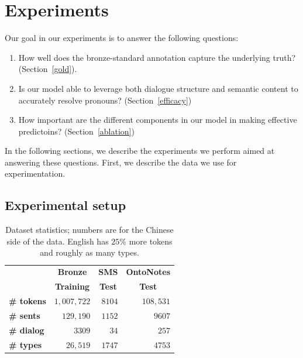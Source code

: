 \documentclass[11pt]{report}
\begin{document}
\section{Experiments} \label{focus_tracking_experiments}

Our goal in our experiments is to answer the following questions:

\begin{enumerate} \itemsep1pt \parskip0pt 
\item How well does the bronze-standard annotation capture the underlying truth? (Section~\ref{gold}).
\item Is our model able to leverage both dialogue structure and semantic content to accurately resolve pronouns? (Section~\ref{efficacy})
\item How important are the different components in our model in making effective predictoins? (Section~\ref{ablation})
\end{enumerate}

In the following sections, we describe the experiments we perform aimed at answering these questions. First, we describe the data we use for experimentation.

\subsection{Experimental setup} \label{setup}

\begin{table}[t]
\begin{footnotesize}
\begin{center}
\begin{tabular}{|l|r|r|r|}
\hline
&
\multicolumn{1}{c|}{\bf Bronze} &
\multicolumn{1}{c|}{\bf SMS} &
\multicolumn{1}{c|}{\bf OntoNotes} \\
&
\multicolumn{1}{c|}{\bf Training} &
\multicolumn{1}{c|}{\bf Test} &
\multicolumn{1}{c|}{\bf Test} \\
\hline
\bf \# tokens & $1,007,722$ & $8104$ & $108,531$ \\ \hline
\bf \# sents  & $129,190$ & $1152$ & $9607$ \\ \hline
\bf \# dialog & $3309$ & $34$ & $257$ \\ \hline
\bf \# types  & $26,519$ & $1747$ & $4753$ \\ \hline
\end{tabular}
\end{center}
\end{footnotesize}
\caption{\label{dataset-numbers} Dataset statistics; numbers are for the Chinese side of the data. English has $25\%$ more tokens and roughly as many types.}
\end{table}
\end{document}
